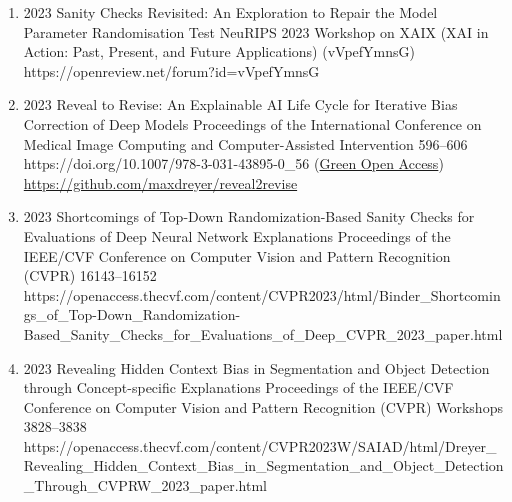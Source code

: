 {\begin{enumerate}
        \item {}
                            {2023}
                            {Sanity Checks Revisited: An Exploration to Repair the Model Parameter Randomisation Test}
                            {NeuRIPS 2023 Workshop on XAIX (XAI in Action: Past, Present, and Future Applications)}
                            {(vVpefYmnsG)}
                            {https://openreview.net/forum?id=vVpefYmnsG} 

        \item {}
                            {2023}
                            {Reveal to Revise: An Explainable AI Life Cycle for Iterative Bias Correction of Deep Models}
                            {Proceedings of the International Conference on Medical Image Computing and Computer-Assisted Intervention}
                            {596--606}
                            {https://doi.org/10.1007/978-3-031-43895-0_56}
                            {(\href{https://arxiv.org/abs/2303.12641}{Green Open Access})\\ \href{https://github.com/maxdreyer/reveal2revise}{https://github.com/maxdreyer/reveal2revise}}


        \item {}
                            {2023}
                            {Shortcomings of Top-Down Randomization-Based Sanity Checks for Evaluations of Deep Neural Network Explanations}
                            {Proceedings of the IEEE/CVF Conference on Computer Vision and Pattern Recognition (CVPR)}
                            {16143--16152}
                            {https://openaccess.thecvf.com/content/CVPR2023/html/Binder_Shortcomings_of_Top-Down_Randomization-Based_Sanity_Checks_for_Evaluations_of_Deep_CVPR_2023_paper.html}

        \item {}
                            {2023}
                            {Revealing Hidden Context Bias in Segmentation and Object Detection through Concept-specific Explanations}
                            {Proceedings of the IEEE/CVF Conference on Computer Vision and Pattern Recognition (CVPR) Workshops}
                            {3828--3838}
                            {https://openaccess.thecvf.com/content/CVPR2023W/SAIAD/html/Dreyer_Revealing_Hidden_Context_Bias_in_Segmentation_and_Object_Detection_Through_CVPRW_2023_paper.html}


\end{enumerate}}
